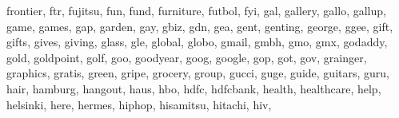 \documentclass[letterpaper,10pt,english]{sphinxmanual}
\begin{document}
\begin{fulllineitems}
\begin{fulllineitems}
\textquotesingle{}frontier\textquotesingle{}, \textquotesingle{}ftr\textquotesingle{}, \textquotesingle{}fujitsu\textquotesingle{}, \textquotesingle{}fun\textquotesingle{}, \textquotesingle{}fund\textquotesingle{}, \textquotesingle{}furniture\textquotesingle{}, \textquotesingle{}futbol\textquotesingle{}, \textquotesingle{}fyi\textquotesingle{}, \textquotesingle{}gal\textquotesingle{}, \textquotesingle{}gallery\textquotesingle{}, \textquotesingle{}gallo\textquotesingle{}, \textquotesingle{}gallup\textquotesingle{}, \textquotesingle{}game\textquotesingle{}, \textquotesingle{}games\textquotesingle{}, \textquotesingle{}gap\textquotesingle{}, \textquotesingle{}garden\textquotesingle{}, \textquotesingle{}gay\textquotesingle{}, \textquotesingle{}gbiz\textquotesingle{}, \textquotesingle{}gdn\textquotesingle{}, \textquotesingle{}gea\textquotesingle{}, \textquotesingle{}gent\textquotesingle{}, \textquotesingle{}genting\textquotesingle{}, \textquotesingle{}george\textquotesingle{}, \textquotesingle{}ggee\textquotesingle{}, \textquotesingle{}gift\textquotesingle{}, \textquotesingle{}gifts\textquotesingle{}, \textquotesingle{}gives\textquotesingle{}, \textquotesingle{}giving\textquotesingle{}, \textquotesingle{}glass\textquotesingle{}, \textquotesingle{}gle\textquotesingle{}, \textquotesingle{}global\textquotesingle{}, \textquotesingle{}globo\textquotesingle{}, \textquotesingle{}gmail\textquotesingle{}, \textquotesingle{}gmbh\textquotesingle{}, \textquotesingle{}gmo\textquotesingle{}, \textquotesingle{}gmx\textquotesingle{}, \textquotesingle{}godaddy\textquotesingle{}, \textquotesingle{}gold\textquotesingle{}, \textquotesingle{}goldpoint\textquotesingle{}, \textquotesingle{}golf\textquotesingle{}, \textquotesingle{}goo\textquotesingle{}, \textquotesingle{}goodyear\textquotesingle{}, \textquotesingle{}goog\textquotesingle{}, \textquotesingle{}google\textquotesingle{}, \textquotesingle{}gop\textquotesingle{}, \textquotesingle{}got\textquotesingle{}, \textquotesingle{}gov\textquotesingle{}, \textquotesingle{}grainger\textquotesingle{}, \textquotesingle{}graphics\textquotesingle{}, \textquotesingle{}gratis\textquotesingle{}, \textquotesingle{}green\textquotesingle{}, \textquotesingle{}gripe\textquotesingle{}, \textquotesingle{}grocery\textquotesingle{}, \textquotesingle{}group\textquotesingle{}, \textquotesingle{}gucci\textquotesingle{}, \textquotesingle{}guge\textquotesingle{}, \textquotesingle{}guide\textquotesingle{}, \textquotesingle{}guitars\textquotesingle{}, \textquotesingle{}guru\textquotesingle{}, \textquotesingle{}hair\textquotesingle{}, \textquotesingle{}hamburg\textquotesingle{}, \textquotesingle{}hangout\textquotesingle{}, \textquotesingle{}haus\textquotesingle{}, \textquotesingle{}hbo\textquotesingle{}, \textquotesingle{}hdfc\textquotesingle{}, \textquotesingle{}hdfcbank\textquotesingle{}, \textquotesingle{}health\textquotesingle{}, \textquotesingle{}healthcare\textquotesingle{}, \textquotesingle{}help\textquotesingle{}, \textquotesingle{}helsinki\textquotesingle{}, \textquotesingle{}here\textquotesingle{}, \textquotesingle{}hermes\textquotesingle{}, \textquotesingle{}hiphop\textquotesingle{}, \textquotesingle{}hisamitsu\textquotesingle{}, \textquotesingle{}hitachi\textquotesingle{}, \textquotesingle{}hiv\textquotesingle{}, 
\end{fulllineitems}
\end{fulllineitems}
\end{document}
